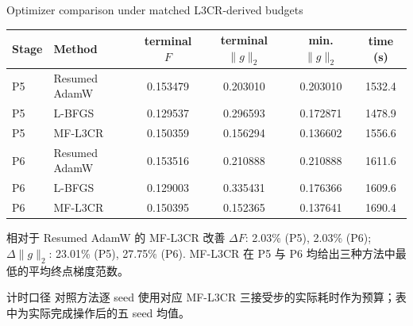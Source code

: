 \begin{frame}{Optimizer comparison under matched L3CR-derived budgets}
\scriptsize
\begin{table}
\centering
\begin{tabular}{llcccc}
\toprule
Stage & Method & terminal $F$ & terminal $\|g\|_2$ & min. $\|g\|_2$ & time (s) \\
\midrule
P5 & Resumed AdamW & 0.153479 & 0.203010 & 0.203010 & 1532.4 \\
P5 & L-BFGS & 0.129537 & 0.296593 & 0.172871 & 1478.9 \\
P5 & MF-L3CR & 0.150359 & 0.156294 & 0.136602 & 1556.6 \\
\midrule
P6 & Resumed AdamW & 0.153516 & 0.210888 & 0.210888 & 1611.6 \\
P6 & L-BFGS & 0.129003 & 0.335431 & 0.176366 & 1609.6 \\
P6 & MF-L3CR & 0.150395 & 0.152365 & 0.137641 & 1690.4 \\
\bottomrule
\end{tabular}
\end{table}
\begin{block}{相对于 Resumed AdamW 的 MF-L3CR 改善}
$\Delta F$: 2.03\% (P5), 2.03\% (P6); $\Delta\|g\|_2$: 23.01\% (P5), 27.75\% (P6).
MF-L3CR 在 P5 与 P6 均给出三种方法中最低的平均终点梯度范数。
\end{block}
\begin{block}{计时口径}
对照方法逐 seed 使用对应 MF-L3CR 三接受步的实际耗时作为预算；表中为实际完成操作后的五 seed 均值。
\end{block}
\end{frame}
